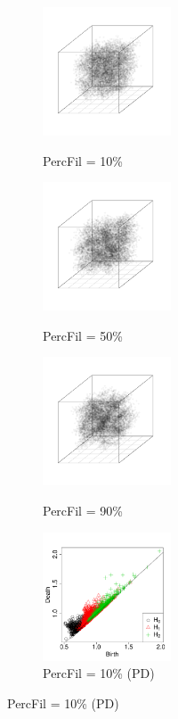 \documentclass[12pt]{article}
\begin{document}
\begin{center}
  \begin{figure}[htp!]
    \centering
    \begin{subfigure}{.25\textwidth}
      \centering
      \caption{PercFil = 10\%}
      \includegraphics[height=1.5in]{figure_7_plot_pf_0_1.pdf}
      \label{fig:percfil01voronoi}
    \end{subfigure}
      \begin{subfigure}{.25\textwidth}
      \centering
      \caption{PercFil = 50\%}
      \includegraphics[height=1.5in]{figure_7_plot_pf_0_5.pdf}
      \label{fig:percfil09voronoi}
    \end{subfigure}
      \begin{subfigure}{.25\textwidth}
      \centering
      \caption{PercFil = 90\%}
      \includegraphics[height=1.5in]{figure_7_plot_pf_0_9.pdf}
      \label{fig:percfil09voronoi}
    \end{subfigure}
      \begin{subfigure}{.25\textwidth}
      \centering
      \caption{PercFil = 10\% (PD)}
      \includegraphics[height=1.5in]{figure_7_pd_0_1.pdf}

\end{subfigure}
\end{figure}
\end{center}
\end{document}
